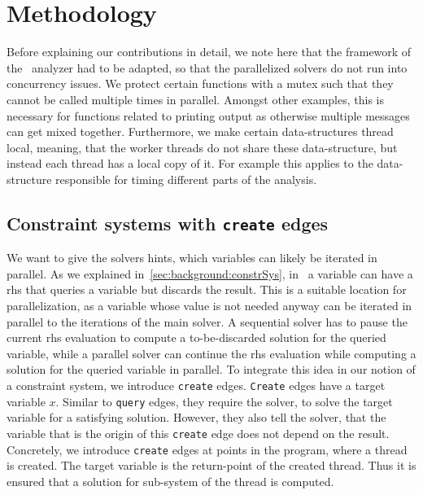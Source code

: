 \section{Methodology}
\label{sec:method}
Before explaining our contributions in detail, we note here that the framework of the \gob\ analyzer had to be adapted, so that the parallelized solvers do not run into concurrency issues. We  protect certain functions with a mutex such that they cannot be called multiple times in parallel. Amongst other examples, this is necessary for functions related to printing output as otherwise multiple messages can get mixed together. Furthermore, we make certain data-structures thread local, meaning, that the worker threads do not share these data-structure, but instead each thread has a local copy of it. For example this applies to the data-structure responsible for timing different parts of the analysis.

  \subsection{Constraint systems with \texttt{create} edges}
  \label{sec:method:create}
  We want to give the solvers hints, which variables can likely be iterated in parallel. As we explained in~\autoref{sec:background:constrSys}, in \gob\ a variable can have a \ac{rhs} that queries a variable but discards the result. This is a suitable location for parallelization, as a variable whose value is not needed anyway can be iterated in parallel to the iterations of the main solver. A sequential solver has to pause the current \ac{rhs} evaluation to compute a to-be-discarded solution for the queried variable, while a parallel solver can continue the \ac{rhs} evaluation while computing a solution for the queried variable in parallel.
  To integrate this idea in our notion of a constraint system, we introduce \texttt{create} edges. \texttt{Create} edges have a target variable $x$. Similar to \texttt{query} edges, they require the solver, to solve the target variable for a satisfying solution. However, they also tell the solver, that the variable that is the origin of this \texttt{create} edge does not depend on the result. Concretely, we introduce \texttt{create} edges at points in the program, where a thread is created. The target variable is the return-point of the created thread. Thus it is ensured that a solution for sub-system of the thread is computed.

